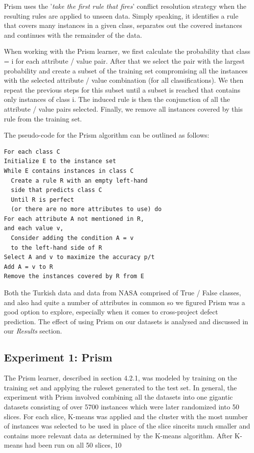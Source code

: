 \documentclass{sig-alternate}
\begin{document}
Prism uses the '{\em take the first rule that fires}' conflict resolution strategy when the resulting rules are applied to unseen data. Simply speaking, it identifies a rule that covers many instances in a given class, separates out the covered instances and continues with the remainder of the data.

When working with the Prism learner, we first calculate the probability that class = i for each attribute / value pair. After that we select the pair with the largest probability and create a subset of the training set compromising all the instances with the selected attribute / value combination (for all classifications). We then repeat the previous steps for this subset until a subset is reached that contains only instances of class i. The induced rule is then the conjunction of all the attribute / value pairs selected. Finally, we remove all instances covered by this rule from the training set.


The pseudo-code for the Prism algorithm can be outlined as follows:
\begin{verbatim}
For each class C
Initialize E to the instance set
While E contains instances in class C
  Create a rule R with an empty left-hand
  side that predicts class C
  Until R is perfect 
  (or there are no more attributes to use) do
For each attribute A not mentioned in R, 
and each value v,
  Consider adding the condition A = v 
  to the left-hand side of R
Select A and v to maximize the accuracy p/t
Add A = v to R
Remove the instances covered by R from E
\end{verbatim}

Both the Turkish data and data from NASA comprised of True / False classes, and also had quite a number of attributes in common so we figured Prism was a good option to explore, especially when it comes to cross-project defect prediction. The effect of using Prism on our datasets is analysed and discussed in our {\em Results} section.


\subsection{Experiment 1: Prism}

The Prism learner, described in section 4.2.1, was modeled by training on the training set and applying the ruleset generated to the test set. In general, the experiment with Prism involved combining all the datasets into one gigantic datasets consisting of over 5700 instances which were later randomized into 50 slices. For each slice, K-means was applied and the cluster with the most number of instances was selected to be used in place of the slice sinceits much smaller and contains more relevant data as determined by the K-means algorithm. After K-means had been run on all 50 slices, 10%
\end{document}
